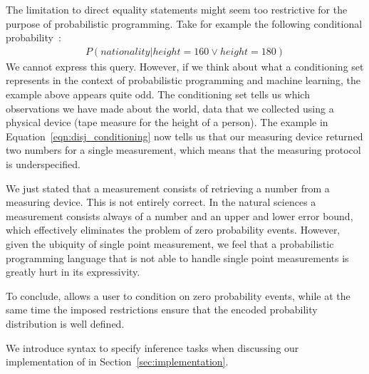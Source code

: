 The limitation to direct equality statements might seem too restrictive for the purpose of probabilistic programming. Take for example the following conditional probability~\citep{nitti2016probabilistic}:
\begin{align}
	P(nationality| height {=} 160 \lor height {=} 180) \label{eqn:disj_conditioning}
\end{align}
We cannot express this query. However, if we think about what a conditioning set represents in the context of probabilistic programming and machine learning, the example above appears quite odd. The conditioning set tells us which observations we have made about the world, \ie data that we collected using a physical device (\eg tape measure for the height of a person). The example in Equation~\ref{eqn:disj_conditioning} now tells us that our measuring device returned two numbers for a single measurement, which means that the measuring protocol is underspecified.

We just stated that a measurement consists of retrieving a number from a measuring device. This is not entirely correct. In the natural sciences a measurement consists always of a number and an upper and lower error bound, which effectively eliminates the problem of zero probability events. However, given the ubiquity of single point measurement, we feel that a probabilistic programming language that is not able to handle single point measurements is greatly hurt in its expressivity.

To conclude,  \dcproblogsty allows a user to condition on zero probability events, while at the same time the imposed restrictions ensure that the encoded probability distribution is well defined.



We introduce syntax to specify inference tasks when discussing our implementation of \dcproblogsty in Section~\ref{sec:implementation}.